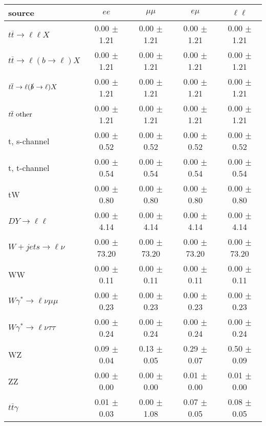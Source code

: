 \begin{tabular}{l|cccc} \hline\hline
source & $ee$ & $\mu\mu$ & $e\mu$ & $\ell\ell $ \\
\hline
$t\overline{t} \rightarrow \ell \ell X$ &  0.00 $\pm$  1.21 &  0.00 $\pm$  1.21 &  0.00 $\pm$  1.21 &  0.00 $\pm$  1.21 \\
$t\overline{t} \rightarrow \ell (b \rightarrow \ell) X$ &  0.00 $\pm$  1.21 &  0.00 $\pm$  1.21 &  0.00 $\pm$  1.21 &  0.00 $\pm$  1.21 \\
$t\overline{t} \rightarrow \ell (\slashed b \rightarrow \ell) X$ &  0.00 $\pm$  1.21 &  0.00 $\pm$  1.21 &  0.00 $\pm$  1.21 &  0.00 $\pm$  1.21 \\
        $t\overline{t}\ \rm{other}$ &  0.00 $\pm$  1.21 &  0.00 $\pm$  1.21 &  0.00 $\pm$  1.21 &  0.00 $\pm$  1.21 \\
\hline
                       t, s-channel &  0.00 $\pm$  0.52 &  0.00 $\pm$  0.52 &  0.00 $\pm$  0.52 &  0.00 $\pm$  0.52 \\
                       t, t-channel &  0.00 $\pm$  0.54 &  0.00 $\pm$  0.54 &  0.00 $\pm$  0.54 &  0.00 $\pm$  0.54 \\
                                 tW &  0.00 $\pm$  0.80 &  0.00 $\pm$  0.80 &  0.00 $\pm$  0.80 &  0.00 $\pm$  0.80 \\
\hline
         $DY \rightarrow \ell \ell$ &  0.00 $\pm$  4.14 &  0.00 $\pm$  4.14 &  0.00 $\pm$  4.14 &  0.00 $\pm$  4.14 \\
      $W+jets \rightarrow \ell \nu$ &  0.00 $\pm$ 73.20 &  0.00 $\pm$ 73.20 &  0.00 $\pm$ 73.20 &  0.00 $\pm$ 73.20 \\
                                 WW &  0.00 $\pm$  0.11 &  0.00 $\pm$  0.11 &  0.00 $\pm$  0.11 &  0.00 $\pm$  0.11 \\
\hline
$W\gamma^{*} \rightarrow \ell \nu \mu\mu$ &  0.00 $\pm$  0.23 &  0.00 $\pm$  0.23 &  0.00 $\pm$  0.23 &  0.00 $\pm$  0.23 \\
$W\gamma^{*} \rightarrow \ell \nu \tau\tau$ &  0.00 $\pm$  0.24 &  0.00 $\pm$  0.24 &  0.00 $\pm$  0.24 &  0.00 $\pm$  0.24 \\
                                 WZ &  0.09 $\pm$  0.04 &  0.13 $\pm$  0.05 &  0.29 $\pm$  0.07 &  0.50 $\pm$  0.09 \\
                                 ZZ &  0.00 $\pm$  0.00 &  0.00 $\pm$  0.00 &  0.01 $\pm$  0.00 &  0.01 $\pm$  0.00 \\
\hline
              $t\overline{t}\gamma$ &  0.01 $\pm$  0.03 &  0.00 $\pm$  1.08 &  0.07 $\pm$  0.05 &  0.08 $\pm$  0.05 \\

\end{tabular}
